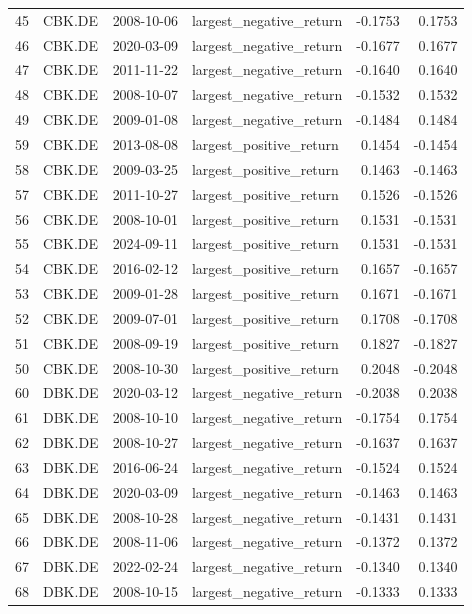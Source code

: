 \begin{table}
\begin{tabular}{llllrr}
45 & CBK.DE & 2008-10-06 & largest_negative_return & -0.1753 & 0.1753 \\
46 & CBK.DE & 2020-03-09 & largest_negative_return & -0.1677 & 0.1677 \\
47 & CBK.DE & 2011-11-22 & largest_negative_return & -0.1640 & 0.1640 \\
48 & CBK.DE & 2008-10-07 & largest_negative_return & -0.1532 & 0.1532 \\
49 & CBK.DE & 2009-01-08 & largest_negative_return & -0.1484 & 0.1484 \\
59 & CBK.DE & 2013-08-08 & largest_positive_return & 0.1454 & -0.1454 \\
58 & CBK.DE & 2009-03-25 & largest_positive_return & 0.1463 & -0.1463 \\
57 & CBK.DE & 2011-10-27 & largest_positive_return & 0.1526 & -0.1526 \\
56 & CBK.DE & 2008-10-01 & largest_positive_return & 0.1531 & -0.1531 \\
55 & CBK.DE & 2024-09-11 & largest_positive_return & 0.1531 & -0.1531 \\
54 & CBK.DE & 2016-02-12 & largest_positive_return & 0.1657 & -0.1657 \\
53 & CBK.DE & 2009-01-28 & largest_positive_return & 0.1671 & -0.1671 \\
52 & CBK.DE & 2009-07-01 & largest_positive_return & 0.1708 & -0.1708 \\
51 & CBK.DE & 2008-09-19 & largest_positive_return & 0.1827 & -0.1827 \\
50 & CBK.DE & 2008-10-30 & largest_positive_return & 0.2048 & -0.2048 \\
60 & DBK.DE & 2020-03-12 & largest_negative_return & -0.2038 & 0.2038 \\
61 & DBK.DE & 2008-10-10 & largest_negative_return & -0.1754 & 0.1754 \\
62 & DBK.DE & 2008-10-27 & largest_negative_return & -0.1637 & 0.1637 \\
63 & DBK.DE & 2016-06-24 & largest_negative_return & -0.1524 & 0.1524 \\
64 & DBK.DE & 2020-03-09 & largest_negative_return & -0.1463 & 0.1463 \\
65 & DBK.DE & 2008-10-28 & largest_negative_return & -0.1431 & 0.1431 \\
66 & DBK.DE & 2008-11-06 & largest_negative_return & -0.1372 & 0.1372 \\
67 & DBK.DE & 2022-02-24 & largest_negative_return & -0.1340 & 0.1340 \\
68 & DBK.DE & 2008-10-15 & largest_negative_return & -0.1333 & 0.1333 \\

\end{tabular}
\end{table}
